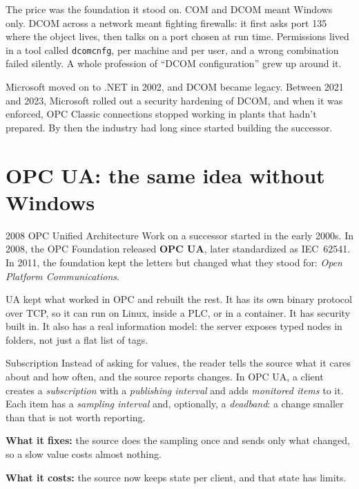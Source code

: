 The price was the foundation it stood on. COM and DCOM meant Windows only. DCOM
across a network meant fighting firewalls: it first asks port 135 where the
object lives, then talks on a port chosen at run time. Permissions lived in a
tool called \texttt{dcomcnfg}, per machine and per user, and a wrong combination
failed silently. A whole profession of ``DCOM configuration'' grew up around it.

Microsoft moved on to .NET in 2002, and DCOM became legacy. Between 2021 and
2023, Microsoft rolled out a security hardening of DCOM, and when it was
enforced, OPC Classic connections stopped working in plants that hadn't
prepared. By then the industry had long since started building the successor.

\section{OPC UA: the same idea without Windows}

\begin{history}{2008 \textperiodcentered{} OPC Unified Architecture}
Work on a successor started in the early 2000s. In 2008, the OPC Foundation
released \textbf{OPC UA}, later standardized as IEC~62541. In 2011, the
foundation kept the letters but changed what they stood for: \emph{Open Platform
Communications}.
\end{history}

UA kept what worked in OPC and rebuilt the rest. It has its own binary protocol
over TCP, so it can run on Linux, inside a PLC, or in a container. It has
security built in. It also has a real information model: the server exposes
typed nodes in folders, not just a flat list of tags.

\begin{concept}{Subscription}
Instead of asking for values, the reader tells the source what it cares about
and how often, and the source reports changes. In OPC UA, a client creates a
\emph{subscription} with a \emph{publishing interval} and adds \emph{monitored
items} to it. Each item has a \emph{sampling interval} and, optionally, a
\emph{deadband}: a change smaller than that is not worth reporting.

\textbf{What it fixes:} the source does the sampling once and sends only what
changed, so a slow value costs almost nothing.

\textbf{What it costs:} the source now keeps state per client, and that state
has limits.
\end{concept}

